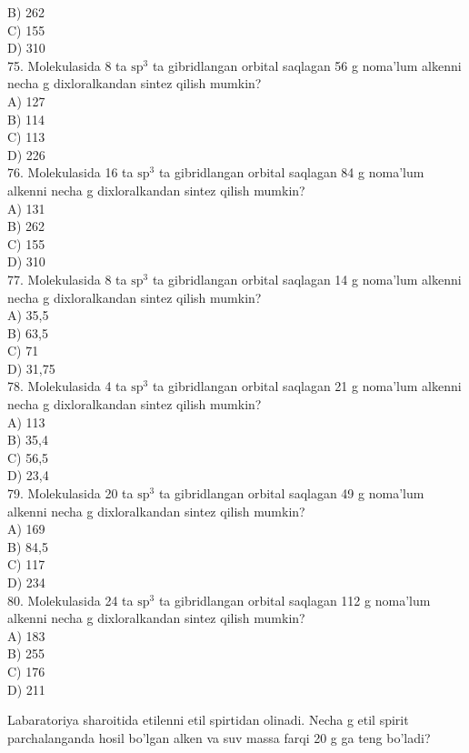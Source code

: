 B) 262\\
C) 155\\
D) 310\\
75. Molekulasida 8 ta $\mathrm{sp}^{3}$ ta gibridlangan orbital saqlagan 56 g noma'lum alkenni necha g dixloralkandan sintez qilish mumkin?\\
A) 127\\
B) 114\\
C) 113\\
D) 226\\
76. Molekulasida 16 ta $\mathrm{sp}^{3}$ ta gibridlangan orbital saqlagan 84 g noma'lum alkenni necha g dixloralkandan sintez qilish mumkin?\\
A) 131\\
B) 262\\
C) 155\\
D) 310\\
77. Molekulasida 8 ta $\mathrm{sp}^{3}$ ta gibridlangan orbital saqlagan 14 g noma'lum alkenni necha g dixloralkandan sintez qilish mumkin?\\
A) 35,5\\
B) 63,5\\
C) 71\\
D) 31,75\\
78. Molekulasida 4 ta $\mathrm{sp}^{3}$ ta gibridlangan orbital saqlagan 21 g noma'lum alkenni necha g dixloralkandan sintez qilish mumkin?\\
A) 113\\
B) 35,4\\
C) 56,5\\
D) 23,4\\
79. Molekulasida 20 ta $\mathrm{sp}^{3}$ ta gibridlangan orbital saqlagan 49 g noma'lum alkenni necha g dixloralkandan sintez qilish mumkin?\\
A) 169\\
B) 84,5\\
C) 117\\
D) 234\\
80. Molekulasida 24 ta $\mathrm{sp}^{3}$ ta gibridlangan orbital saqlagan 112 g noma'lum alkenni necha g dixloralkandan sintez qilish mumkin?\\
A) 183\\
B) 255\\
C) 176\\
D) 211
  \item Labaratoriya sharoitida etilenni etil spirtidan olinadi. Necha g etil spirit parchalanganda hosil bo'lgan alken va suv massa farqi 20 g ga teng bo'ladi?\\
